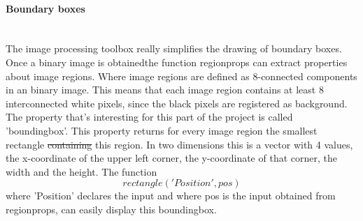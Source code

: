 \documentclass{article}
\providecommand{\DIFaddtex}[1]{{\protect\color{blue}\uwave{#1}}} %
\providecommand{\DIFdeltex}[1]{{\protect\color{red}\sout{#1}}}                      %
\providecommand{\DIFaddbegin}{} %
\providecommand{\DIFaddend}{} %
\providecommand{\DIFdelbegin}{} %
\providecommand{\DIFdelend}{} %
\providecommand{\DIFadd}[1]{\texorpdfstring{\DIFaddtex{#1}}{#1}} %
\providecommand{\DIFdel}[1]{\texorpdfstring{\DIFdeltex{#1}}{}} %
\newcommand{\DIFscaledelfig}{0.5}
\newlength{\DIFdelgraphicswidth} %
\newlength{\DIFdelgraphicsheight} %
\newcommand{\DIFaddincludegraphics}[2][]{{\color{blue}\fbox{\DIFOincludegraphics[#1]{#2}}}} %
\newcommand{\DIFdelincludegraphics}[2][]{%
\sbox{\DIFdelgraphicsbox}{\DIFOincludegraphics[#1]{#2}}%
\settoboxwidth{\DIFdelgraphicswidth}{\DIFdelgraphicsbox} %
\settoboxtotalheight{\DIFdelgraphicsheight}{\DIFdelgraphicsbox} %
\scalebox{\DIFscaledelfig}{%
\parbox[b]{\DIFdelgraphicswidth}{\usebox{\DIFdelgraphicsbox}\\[-\baselineskip] \rule{\DIFdelgraphicswidth}{0em}}\llap{\resizebox{\DIFdelgraphicswidth}{\DIFdelgraphicsheight}{%
\setlength{\unitlength}{\DIFdelgraphicswidth}%
\begin{picture}(1,1)%
\thicklines\linethickness{2pt} %
{\color[rgb]{1,0,0}\put(0,0){\framebox(1,1){}}}%
{\color[rgb]{1,0,0}\put(0,0){\line( 1,1){1}}}%
{\color[rgb]{1,0,0}\put(0,1){\line(1,-1){1}}}%
\end{picture}%
}\hspace*{3pt}}} %
} %
\DeclareRobustCommand{\DIFaddbegin}{\DIFOaddbegin \let\includegraphics\DIFaddincludegraphics} %
\DeclareRobustCommand{\DIFaddend}{\DIFOaddend \let\includegraphics\DIFOincludegraphics} %
\DeclareRobustCommand{\DIFdelbegin}{\DIFOdelbegin \let\includegraphics\DIFdelincludegraphics} %
\DeclareRobustCommand{\DIFdelend}{\DIFOaddend \let\includegraphics\DIFOincludegraphics} %
\begin{document}
\paragraph{Boundary boxes}\mbox{}\\
The image processing toolbox really simplifies the drawing of boundary boxes. Once a binary image is obtained\DIFaddbegin \DIFadd{, }\DIFaddend the function regionprops \cite{Mathworks} can extract properties about image regions. Where image regions are defined as 8-connected components in an binary image. This means that each image region contains at least 8 interconnected white pixels, since the black pixels are registered as background. The property that's interesting for this part of the project is called 'boundingbox'. This property returns for every image region the smallest rectangle \DIFdelbegin \DIFdel{containing }\DIFdelend \DIFaddbegin \DIFadd{that contains }\DIFaddend this region. In two dimensions this is a vector with 4 values, the x-coordinate of the upper left corner, the y-coordinate of that corner, the width and the height. The function 
\begin{equation}
rectangle('Position', pos)
\end{equation}
where 'Position' declares the input and where pos is the input obtained from regionprops, can easily display this boundingbox. 
\end{document}
